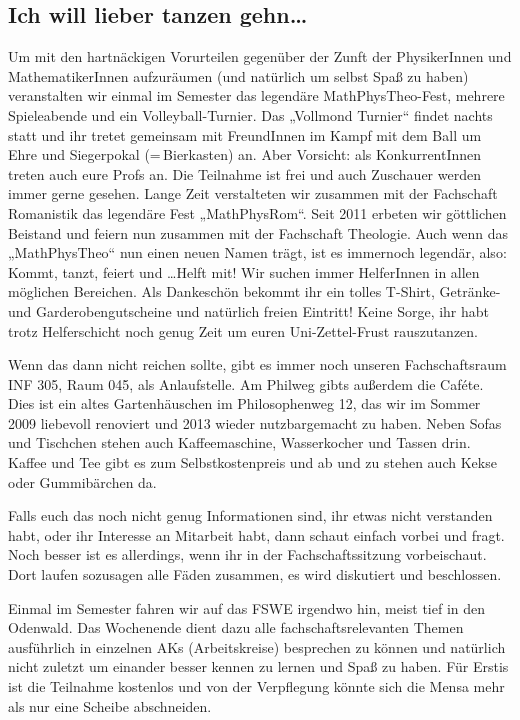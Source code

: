 \subsection*{Ich will lieber tanzen gehn\dots}
Um mit den hartnäckigen Vorurteilen gegenüber der Zunft der PhysikerInnen und MathematikerInnen aufzuräumen (und natürlich um selbst Spaß zu haben) veranstalten wir einmal im Semester das legendäre MathPhysTheo-Fest, mehrere Spieleabende und ein Volleyball-Turnier.
Das „Vollmond Turnier“ findet nachts statt und ihr tretet gemeinsam mit FreundInnen im Kampf mit dem Ball um Ehre und Siegerpokal (=\,Bierkasten) an. Aber Vorsicht: als KonkurrentInnen treten auch eure Profs an. Die Teilnahme ist frei und auch Zuschauer werden immer gerne gesehen.
Lange Zeit verstalteten wir zusammen mit der Fachschaft Romanistik das legendäre Fest „MathPhysRom“. Seit 2011 erbeten wir göttlichen Beistand und feiern nun zusammen mit der Fachschaft Theologie. Auch wenn das „MathPhysTheo“ nun einen neuen Namen trägt, ist es immernoch legendär, also: Kommt, tanzt, feiert und \dots Helft mit! Wir suchen immer HelferInnen in allen möglichen Bereichen. Als Dankeschön bekommt ihr ein tolles T-Shirt, Getränke- und Garderobengutscheine und natürlich freien Eintritt! Keine Sorge, ihr habt trotz Helferschicht noch genug Zeit um euren Uni-Zettel-Frust rauszutanzen.

Wenn das dann nicht reichen sollte, gibt es immer noch unseren Fachschaftsraum INF 305, Raum 045, als Anlaufstelle.
Am Philweg gibts außerdem die Caféte. Dies ist ein altes Gartenhäuschen im Philosophenweg 12, das wir im Sommer 2009 liebevoll renoviert und 2013 wieder nutzbargemacht zu haben. Neben Sofas und Tischchen stehen auch Kaffeemaschine, Wasserkocher und Tassen drin. Kaffee und Tee gibt es zum Selbstkostenpreis und ab und zu stehen auch Kekse oder Gummibärchen da.

Falls euch das noch nicht genug Informationen sind, ihr etwas nicht verstanden habt, oder ihr Interesse an Mitarbeit habt, dann schaut einfach vorbei und fragt. Noch besser ist es allerdings, wenn ihr in der Fachschaftssitzung vorbeischaut. Dort laufen sozusagen alle Fäden zusammen, es wird diskutiert und beschlossen.

Einmal im Semester fahren wir auf das \gls{FSWE} irgendwo hin, meist tief in den Odenwald. Das Wochenende dient dazu alle fachschaftsrelevanten Themen ausführlich in einzelnen AKs (Arbeitskreise) besprechen zu können und natürlich nicht zuletzt um einander besser kennen zu lernen und Spaß zu haben. Für Erstis ist die Teilnahme kostenlos und von der Verpflegung könnte sich die Mensa mehr als nur eine Scheibe abschneiden.
